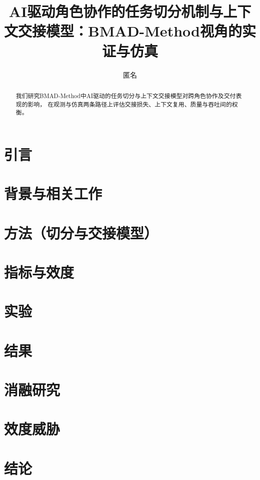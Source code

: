 \documentclass[UTF8]{ctexart}
\title{AI驱动角色协作的任务切分机制与上下文交接模型：BMAD-Method视角的实证与仿真}
\author{匿名}
\date{}
\begin{document}
\maketitle

\begin{abstract}
我们研究BMAD-Method中AI驱动的任务切分与上下文交接模型对跨角色协作及交付表现的影响，
在观测与仿真两条路径上评估交接损失、上下文复用、质量与吞吐间的权衡。
\end{abstract}

\section{引言}

\section{背景与相关工作}

\section{方法（切分与交接模型）}

\section{指标与效度}

\section{实验}

\section{结果}

\section{消融研究}

\section{效度威胁}

\section{结论}



\end{document}
